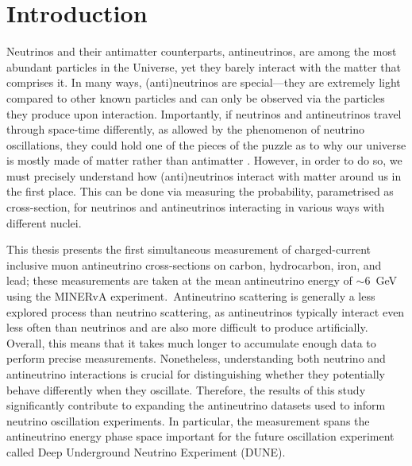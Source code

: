 \chapter{Introduction}

\label{ch:introduction}


Neutrinos and their antimatter counterparts, antineutrinos, are among the most abundant particles in the Universe, yet they barely interact with the matter that comprises it. In many ways, (anti)neutrinos are special---they are extremely light compared to other known particles and can only be observed via the particles they produce upon interaction. Importantly, if neutrinos and antineutrinos travel through space-time differently, as allowed by the phenomenon of neutrino oscillations, they could hold one of the pieces of the puzzle as to why our universe is mostly made of matter rather than antimatter \cite{AndreiSakharov_1991}. However, in order to do so, we must precisely understand how (anti)neutrinos interact with matter around us in the first place. This can be done via measuring the probability, parametrised as cross-section, for neutrinos and antineutrinos interacting in various ways with different nuclei. 

This thesis presents the first simultaneous measurement of charged-current inclusive muon antineutrino cross-sections on carbon, hydrocarbon, iron, and lead; these measurements are taken at the mean antineutrino energy of $\sim$6~GeV using the MINERvA experiment.~Antineutrino scattering is generally a less explored process than neutrino scattering, as antineutrinos typically interact even less often than neutrinos and are also more difficult to produce artificially. Overall, this means that it takes much longer to accumulate enough data to perform precise measurements. Nonetheless, understanding both neutrino and antineutrino interactions is crucial for distinguishing whether they potentially behave differently when they oscillate. Therefore, the results of this study significantly contribute to expanding the antineutrino datasets used to inform neutrino oscillation experiments. In particular, the measurement spans the antineutrino energy phase space important for the future oscillation experiment called Deep Underground Neutrino Experiment (DUNE). 

